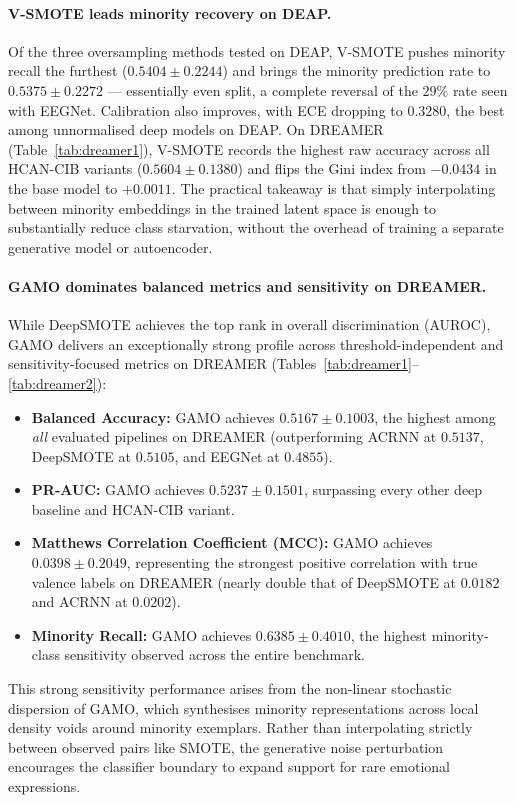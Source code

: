 \documentclass[a4paper,fleqn]{cas-sc}
\begin{document}
\paragraph{V-SMOTE leads minority recovery on DEAP.}
Of the three oversampling methods tested on DEAP, V-SMOTE pushes minority recall the furthest ($0.5404\pm0.2244$) and brings the minority prediction rate to $0.5375\pm0.2272$ --- essentially even split, a complete reversal of the $29\%$ rate seen with EEGNet. Calibration also improves, with ECE dropping to $0.3280$, the best among unnormalised deep models on DEAP. On DREAMER (Table~\ref{tab:dreamer1}), V-SMOTE records the highest raw accuracy across all HCAN-CIB variants ($0.5604\pm0.1380$) and flips the Gini index from $-0.0434$ in the base model to $+0.0011$. The practical takeaway is that simply interpolating between minority embeddings in the trained latent space is enough to substantially reduce class starvation, without the overhead of training a separate generative model or autoencoder.

\paragraph{GAMO dominates balanced metrics and sensitivity on DREAMER.}
While DeepSMOTE achieves the top rank in overall discrimination (AUROC), GAMO delivers an exceptionally strong profile across threshold-independent and sensitivity-focused metrics on DREAMER (Tables~\ref{tab:dreamer1}--\ref{tab:dreamer2}):
\begin{itemize}
\item \textbf{Balanced Accuracy:} GAMO achieves $\mathbf{0.5167\pm0.1003}$, the highest among \emph{all} evaluated pipelines on DREAMER (outperforming ACRNN at $0.5137$, DeepSMOTE at $0.5105$, and EEGNet at $0.4855$).
\item \textbf{PR-AUC:} GAMO achieves $\mathbf{0.5237\pm0.1501}$, surpassing every other deep baseline and HCAN-CIB variant.
\item \textbf{Matthews Correlation Coefficient (MCC):} GAMO achieves $\mathbf{0.0398\pm0.2049}$, representing the strongest positive correlation with true valence labels on DREAMER (nearly double that of DeepSMOTE at $0.0182$ and ACRNN at $0.0202$).
\item \textbf{Minority Recall:} GAMO achieves $\mathbf{0.6385\pm0.4010}$, the highest minority-class sensitivity observed across the entire benchmark.
\end{itemize}
This strong sensitivity performance arises from the non-linear stochastic dispersion of GAMO, which synthesises minority representations across local density voids around minority exemplars. Rather than interpolating strictly between observed pairs like SMOTE, the generative noise perturbation encourages the classifier boundary to expand support for rare emotional expressions.
\end{document}
